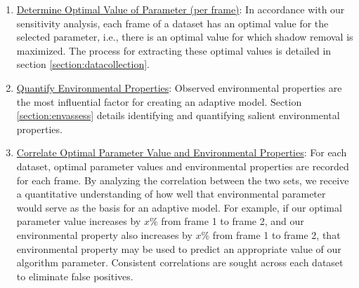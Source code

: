 \documentclass[12pt]{report}
\begin{document}
\begin{enumerate}


\item \underline{Determine Optimal Value of Parameter (per frame)}: In accordance with our sensitivity analysis, each frame of a dataset has an optimal value for the selected parameter, i.e., there is an optimal value for which shadow removal is maximized. The process for extracting these optimal values is detailed in section \ref{section:datacollection}.

\item \underline{Quantify Environmental Properties}: Observed environmental properties are the most influential factor for creating an adaptive model. Section \ref{section:envassess} details identifying and quantifying salient environmental properties. 


\item \underline{Correlate Optimal Parameter Value and Environmental Properties}: For each dataset, optimal parameter values and environmental properties are recorded for each frame. By analyzing the correlation between the two sets, we receive a quantitative understanding of how well that environmental parameter would serve as the basis for an adaptive model. For example, if our optimal parameter value increases by $x\%$ from frame 1 to frame 2, and our environmental property also increases by $x\%$ from frame 1 to frame 2, that environmental property may be used to predict an appropriate value of our algorithm parameter. Consistent correlations are sought across each dataset to eliminate false positives.


\end{enumerate}
\end{document}
